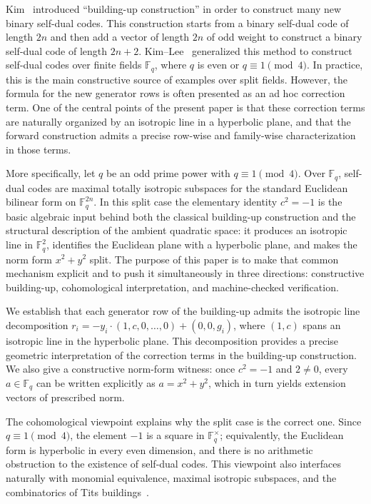 \documentclass[12pt]{article}
\newcommand{\F}{\mathbb{F}}
\begin{document}
Kim~\cite{Kim2001} introduced ``building-up construction'' in order to construct many new binary self-dual codes. This construction starts from a binary self-dual code of length $2n$ and then add a vector of length $2n$ of odd weight to construct a binary self-dual code of length $2n+2$. Kim--Lee~\cite{KimLee2009,LeeKim} generalized this method to construct self-dual codes over finite fields $\mathbb F_q$, where $q$ is even or $q \equiv 1 \pmod{4}$.
 In practice, this is the main constructive source of examples over split fields. However, the formula for the new generator rows is often presented as an ad hoc correction term. One of the central points of the present paper is that these correction terms are naturally organized by an isotropic line in a hyperbolic plane, and that the forward construction admits a precise row-wise and family-wise characterization in those terms.

More specifically, let $q$ be an odd prime power with $q \equiv 1 \pmod 4$. Over $\F_q$, self-dual codes are maximal totally isotropic subspaces for the standard Euclidean bilinear form on $\F_q^{2n}$. In this split case the elementary identity $c^2=-1$ is the basic algebraic input behind both the classical building-up construction and the structural description of the ambient quadratic space: it produces an isotropic line in $\F_q^2$, identifies the Euclidean plane with a hyperbolic plane, and makes the norm form $x^2+y^2$ split. The purpose of this paper is to make that common mechanism explicit and to push it simultaneously in three directions: constructive building-up, cohomological interpretation, and machine-checked verification.

We establish that each generator row of the building-up admits the isotropic line decomposition $r_i = -y_i \cdot (1, c, 0, \ldots, 0) + (0, 0, g_i)$, where $(1, c)$ spans an isotropic line in the hyperbolic plane. This decomposition provides a precise geometric interpretation of the correction terms in the building-up construction. We also give a constructive norm-form witness: once $c^2=-1$ and $2\neq 0$, every $a\in\F_q$ can be written explicitly as $a=x^2+y^2$, which in turn yields extension vectors of prescribed norm.

The cohomological viewpoint explains why the split case is the correct one. Since $q \equiv 1 \pmod 4$, the element $-1$ is a square in $\F_q^\times$; equivalently, the Euclidean form is hyperbolic in every even dimension, and there is no arithmetic obstruction to the existence of self-dual codes. This viewpoint also interfaces naturally with monomial equivalence, maximal isotropic subspaces, and the combinatorics of Tits buildings~\cite{Abramenko,Solomon}.
\end{document}
